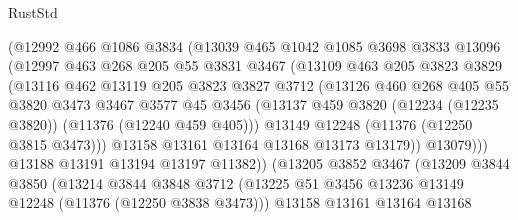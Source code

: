 \begin{lexlean}{RustStd}
\begin{coremodule}
{{{{{{{{{{{{{{{{{{{                    (@12992
                      @466
                      @1086
                      @3834
                      (@13039
                        @465
                        @1042
                        @1085
                        @3698
                        @3833
                        @13096
                        (@12997
                          @463
                          @268
                          @205
                          @55
                          @3831
                          @3467
                          (@13109
                            @463
                            @205
                            @3823
                            @3829
                            (@13116
                              @462
                              @13119
                              @205
                              @3823
                              @3827
                              @3712
                              (@13126
                                @460
                                @268
                                @405
                                @55
                                @3820
                                @3473
                                @3467
                                @3577
                                @45
                                @3456
                                (@13137
                                  @459
                                  @3820
                                  (@12234 (@12235 @3820))
                                  (@11376 (@12240 @459 @405)))
                                @13149
                                @12248
                                (@11376 (@12250 @3815 @3473)))
                              @13158
                              @13161
                              @13164
                              @13168
                              @13173
                              @13179))
                          @13079)))
                    @13188
                    @13191
                    @13194
                    @13197
                    @11382))
                (@13205
                  @3852
                  @3467
                  (@13209
                    @3844
                    @3850
                    (@13214
                      @3844
                      @3848
                      @3712
                      (@13225 @51 @3456 @13236 @13149 @12248 (@11376 (@12250 @3838 @3473)))
                      @13158
                      @13161
                      @13164
                      @13168
}}}}}}}}}}}}}}}}}}}
\end{coremodule}
\end{lexlean}
